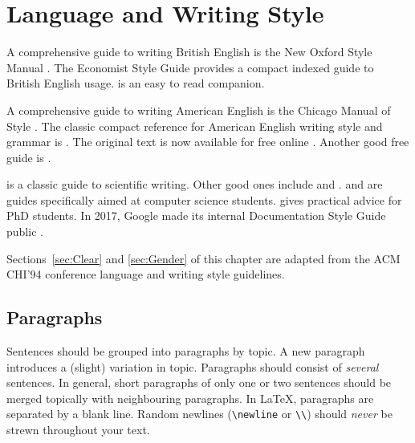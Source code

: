 %
%
% 
% 
% 


\chapter{Language and Writing Style}

\label{chap:Style}


A comprehensive guide to writing British English is the New Oxford
Style Manual \parencite{NewOxfordStyleManual-3Ed}. The Economist Style
Guide \parencite{EconomistStyleGuide-12Ed} provides a compact indexed guide
to British English usage. \textcite{Zinsser-OnWritingWell-7Ed} is an
easy to read companion.

A comprehensive guide to writing American English is the Chicago
Manual of Style \parencite{ChicagoManualStyle-17Ed}.  The classic
compact reference for American English writing style and grammar is
\textcite{StrunkWhite-4Ed}. The original text is now available for
free online \parencite{Strunk-1Ed}. Another good free guide is
\textcite{NASAGuide}.

\textcite{Alley-CraftScientificWriting-4Ed} is a classic guide to
scientific writing. Other good ones include
\textcite{Booth-CraftResearch-4Ed} and
\textcite{Booth-CommunicatingScience-2Ed}.
%
\textcite{Zobel-WritingCompSci} and \textcite{BugsInWriting} are guides
specifically aimed at computer science students.
\textcite{Phillips-HowGetPhD} gives practical advice for PhD
students.
%
In 2017, Google made its internal Documentation Style Guide
public \parencite{GoogleStyleGuide}.


Sections~\ref{sec:Clear} and \ref{sec:Gender} of this chapter are
adapted from the ACM CHI'94 conference language and writing style
guidelines.




\section{Paragraphs}

Sentences should be grouped into paragraphs by topic. A new paragraph
introduces a (slight) variation in topic. Paragraphs should consist of
\emph{several} sentences. In general, short paragraphs of only one or
two sentences should be merged topically with neighbouring paragraphs.
%
In \LaTeX, paragraphs are separated by a blank line. Random newlines
({\smaller\verb|\newline|} or {\smaller\verb|\\|}) should \emph{never}
be strewn throughout your text.


